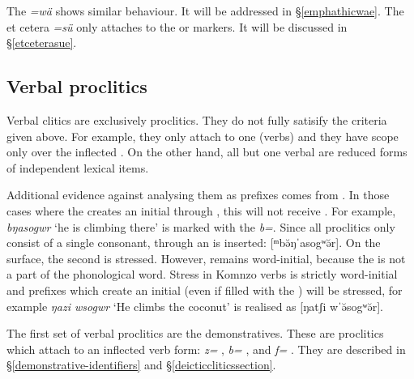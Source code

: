 The   \emph{=wä} shows similar behaviour. It will be addressed in \S{}\ref{emphathicwae}. The et cetera  \emph{=sü} only attaches to the  or   markers. It will be discussed in \S{}\ref{etceterasue}.

\subsection{Verbal proclitics}\label{verbproclitics}

Verbal clitics are exclusively proclitics. They do not fully satisify the criteria given above. For example, they only attach to one  (verbs) and they have scope only over the inflected . On the other hand, all but one verbal  are reduced forms of independent lexical items.%

Additional evidence against analysing them as prefixes comes from . In those cases where the  creates an initial  through , this  will not receive . For example, \emph{bŋasogwr} `he is climbing there' is marked with the   \emph{b=}. Since all proclitics only consist of a single consonant, through  an  is inserted: [ᵐbə̆ŋˈaso{\ᵑ}gʷə̆r]. On the surface, the second  is stressed. However,  remains word-initial, because the  is not a part of the phonological word. Stress in Komnzo verbs is strictly word-initial and prefixes which create an initial  (even if filled with the ) will be stressed, for example \emph{ŋazi wsogwr} `He climbs the coconut' is realised as [ŋatʃi wˈə̆so{\ᵑ}gʷə̆r].%

The first set of verbal proclitics are the  demonstratives. These are  proclitics which attach to an inflected verb form: \emph{z=} \Prox{}, \emph{b=} \Med{}, and \emph{f=} \Dist{}. They are described in \S{}\ref{demonstrative-identifiers} and \S{}\ref{deicticcliticssection}.%

